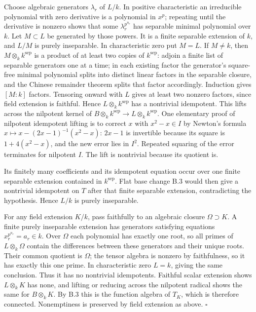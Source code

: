\documentclass[11pt]{article}
\begin{document}
Choose algebraic generators \(\lambda_r\) of \(L/k\). In positive
characteristic an irreducible polynomial with zero derivative is a
polynomial in \(x^p\); repeating until the derivative is nonzero shows
that some \(\lambda_r^{p^{n_r}}\) has separable minimal polynomial over
\(k\). Let \(M\subset L\) be generated by those powers. It is a finite
separable extension of \(k\), and \(L/M\) is purely inseparable. In
characteristic zero put \(M=L\). If \(M\ne k\), then
\(M\otimes_k k^{\mathrm{sep}}\) is a product of at least two copies of
\(k^{\mathrm{sep}}\): adjoin a finite list of separable generators one
at a time; in each existing factor the generator's square-free minimal
polynomial splits into distinct linear factors in the separable closure,
and the Chinese remainder theorem splits that factor accordingly.
Induction gives \([M:k]\) factors. Tensoring onward with \(L\) gives at
least two nonzero factors, since field extension is faithful. Hence
\(L\otimes_k k^{\mathrm{sep}}\) has a nontrivial idempotent. This lifts
across the nilpotent kernel of
\(B\otimes_k k^{\mathrm{sep}}\to L\otimes_k k^{\mathrm{sep}}\). One
elementary proof of nilpotent idempotent lifting is to correct \(x\)
with \(x^2-x\in I\) by Newton's formula
\(x\mapsto x-(2x-1)^{-1}(x^2-x)\): \(2x-1\) is invertible because its
square is \(1+4(x^2-x)\), and the new error lies in \(I^2\). Repeated
squaring of the error terminates for nilpotent \(I\). The lift is
nontrivial because its quotient is.

Its finitely many coefficients and its idempotent equation occur over
one finite separable extension contained in \(k^{\mathrm{sep}}\). Flat
base change B.3 would then give a nontrivial idempotent on \(T\) after
that finite separable extension, contradicting the hypothesis. Hence
\(L/k\) is purely inseparable.

For any field extension \(K/k\), pass faithfully to an algebraic closure
\(\Omega\supset K\). A finite purely inseparable extension has
generators satisfying equations \(x_r^{p^{n_r}}=a_r\in k\). Over
\(\Omega\) each polynomial has exactly one root, so all primes of
\(L\otimes_k\Omega\) contain the differences between these generators
and their unique roots. Their common quotient is \(\Omega\); the tensor
algebra is nonzero by faithfulness, so it has exactly this one prime. In
characteristic zero \(L=k\), giving the same conclusion. Thus it has no
nontrivial idempotents. Faithful scalar extension shows \(L\otimes_k K\)
has none, and lifting or reducing across the nilpotent radical shows the
same for \(B\otimes_k K\). By B.3 this is the function algebra of
\(T_K\), which is therefore connected. Nonemptiness is preserved by
field extension as above. \(\square\)
\end{document}
